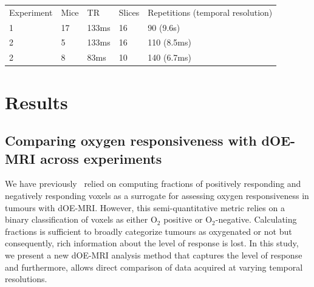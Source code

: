 \documentclass[num-refs]{wiley-article}
\begin{document}
\begin{table}[]
\centering
\begin{tabular}{lllll}
Experiment & Mice & TR & Slices & Repetitions (temporal resolution) \\
 1 & 17 & 133ms & 16 & 90 (9.6s)  \\
 2 & 5 & 133ms & 16 &  110 (8.5ms)  \\
 2 & 8 & 83ms & 10 & 140 (6.7ms) \\
\end{tabular}
\label{scanparams}
\end{table}

%

\section{Results}

\subsection{Comparing oxygen responsiveness with dOE-MRI across experiments}
\label{res1}
We have previously~\cite{Moosvi:2018ca} relied on computing fractions of positively responding and negatively responding voxels as a surrogate for assessing oxygen responsiveness in tumours with dOE-MRI.
However, this semi-quantitative metric relies on a binary classification of voxels as either O$_2$ positive or O$_2$-negative.
Calculating fractions is sufficient to broadly categorize tumours as oxygenated or not but consequently, rich information about the level of response is lost.
In this study, we present a new dOE-MRI analysis method that captures the level of response and furthermore, allows direct comparison of data acquired at varying temporal resolutions.
\end{document}
